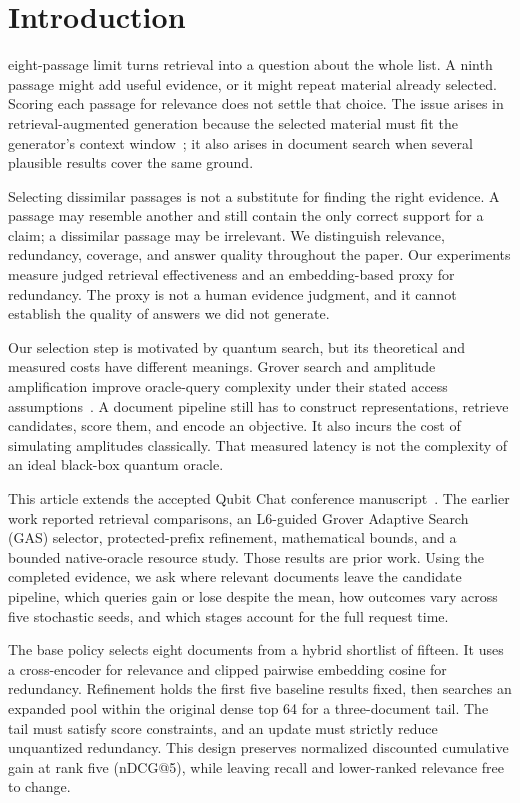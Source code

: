 \section{Introduction}\label{sec:introduction}
 eight-passage limit turns retrieval into a question about the whole list. A ninth passage might add useful evidence, or it might repeat material already selected. Scoring each passage for relevance does not settle that choice. The issue arises in retrieval-augmented generation because the selected material must fit the generator's context window~\cite{lewis2020retrieval}; it also arises in document search when several plausible results cover the same ground.

Selecting dissimilar passages is not a substitute for finding the right evidence. A passage may resemble another and still contain the only correct support for a claim; a dissimilar passage may be irrelevant. We distinguish relevance, redundancy, coverage, and answer quality throughout the paper. Our experiments measure judged retrieval effectiveness and an embedding-based proxy for redundancy. The proxy is not a human evidence judgment, and it cannot establish the quality of answers we did not generate.

Our selection step is motivated by quantum search, but its theoretical and measured costs have different meanings. Grover search and amplitude amplification improve oracle-query complexity under their stated access assumptions~\cite{grover1996search,brassard2002amplitude}. A document pipeline still has to construct representations, retrieve candidates, score them, and encode an objective. It also incurs the cost of simulating amplitudes classically. That measured latency is not the complexity of an ideal black-box quantum oracle.

This article extends the accepted Qubit Chat conference manuscript~\cite{conference2026}. The earlier work reported retrieval comparisons, an L6-guided Grover Adaptive Search (GAS) selector, protected-prefix refinement, mathematical bounds, and a bounded native-oracle resource study. Those results are prior work. Using the completed evidence, we ask where relevant documents leave the candidate pipeline, which queries gain or lose despite the mean, how outcomes vary across five stochastic seeds, and which stages account for the full request time.

The base policy selects eight documents from a hybrid shortlist of fifteen. It uses a cross-encoder for relevance and clipped pairwise embedding cosine for redundancy. Refinement holds the first five baseline results fixed, then searches an expanded pool within the original dense top 64 for a three-document tail. The tail must satisfy score constraints, and an update must strictly reduce unquantized redundancy. This design preserves normalized discounted cumulative gain at rank five (nDCG@5), while leaving recall and lower-ranked relevance free to change.

